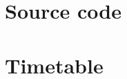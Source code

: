 \documentclass[10pt,a4paper]{article}
\newcommand{\includecode}[2][c]{<!---->}
\def\HOME{../..}
\def\KSRC{\HOME/src/kernel}
\begin{document}


\begin{appendices}

    \section{Source code}
    \section{Timetable}
        \label{app:timetable}



%


%
%    
%    

%    
%    
%    
%
\end{appendices}
\end{document}

